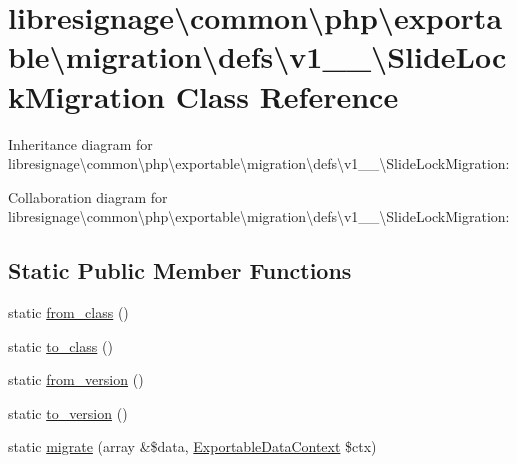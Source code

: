 \hypertarget{classlibresignage_1_1common_1_1php_1_1exportable_1_1migration_1_1defs_1_1v1__0__0_1_1SlideLockMigration}{}\section{libresignage\textbackslash{}common\textbackslash{}php\textbackslash{}exportable\textbackslash{}migration\textbackslash{}defs\textbackslash{}v1\+\_\+\_\textbackslash{}Slide\+Lock\+Migration Class Reference}
\label{classlibresignage_1_1common_1_1php_1_1exportable_1_1migration_1_1defs_1_1v1__0__0_1_1SlideLockMigration}


Inheritance diagram for libresignage\textbackslash{}common\textbackslash{}php\textbackslash{}exportable\textbackslash{}migration\textbackslash{}defs\textbackslash{}v1\+\_\+\_\textbackslash{}Slide\+Lock\+Migration\+:


Collaboration diagram for libresignage\textbackslash{}common\textbackslash{}php\textbackslash{}exportable\textbackslash{}migration\textbackslash{}defs\textbackslash{}v1\+\_\+\_\textbackslash{}Slide\+Lock\+Migration\+:
\subsection*{Static Public Member Functions}
\begin{DoxyCompactItemize}
\item 
static \hyperlink{classlibresignage_1_1common_1_1php_1_1exportable_1_1migration_1_1defs_1_1v1__0__0_1_1SlideLockMigration_acbc046ff4058376908f733d7a4477d35}{from\+\_\+class} ()
\item 
static \hyperlink{classlibresignage_1_1common_1_1php_1_1exportable_1_1migration_1_1defs_1_1v1__0__0_1_1SlideLockMigration_a22f0d2e675217b42d859e96e93cf5632}{to\+\_\+class} ()
\item 
static \hyperlink{classlibresignage_1_1common_1_1php_1_1exportable_1_1migration_1_1defs_1_1v1__0__0_1_1SlideLockMigration_a125dc19fdd6feddbb2a410667282d89b}{from\+\_\+version} ()
\item 
static \hyperlink{classlibresignage_1_1common_1_1php_1_1exportable_1_1migration_1_1defs_1_1v1__0__0_1_1SlideLockMigration_aca4a9060c5f5bf8ad2ca301ec6c1079f}{to\+\_\+version} ()
\item 
static \hyperlink{classlibresignage_1_1common_1_1php_1_1exportable_1_1migration_1_1defs_1_1v1__0__0_1_1SlideLockMigration_a42f559558b8e74322a93404b63b5e22f}{migrate} (array \&\$data, \hyperlink{classlibresignage_1_1common_1_1php_1_1exportable_1_1ExportableDataContext}{Exportable\+Data\+Context} \$ctx)
\end{DoxyCompactItemize}


